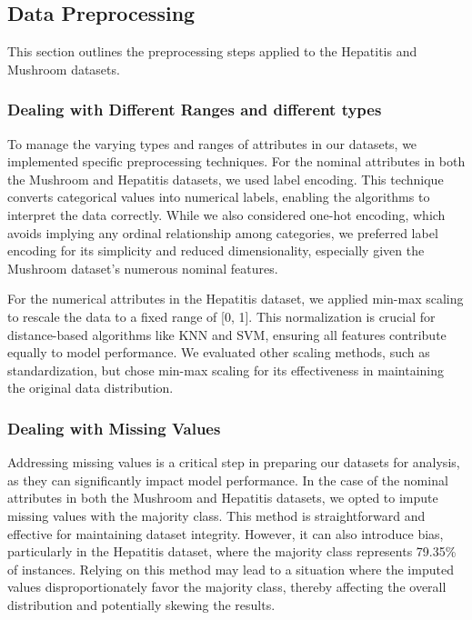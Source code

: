 \subsection{Data Preprocessing}
\label{subsec:preprocessing}

This section outlines the preprocessing steps applied to the Hepatitis and Mushroom datasets.

\subsubsection{Dealing with Different Ranges and different types}
To manage the varying types and ranges of attributes in our datasets, we implemented specific preprocessing techniques.
For the nominal attributes in both the Mushroom and Hepatitis datasets, we used label encoding.
This technique converts categorical values into numerical labels, enabling the algorithms to interpret the data correctly.
While we also considered one-hot encoding, which avoids implying any ordinal relationship among categories, we preferred label encoding for its simplicity and reduced dimensionality, especially given the Mushroom dataset's numerous nominal features.

For the numerical attributes in the Hepatitis dataset, we applied min-max scaling to rescale the data to a fixed range of [0, 1]. This normalization is crucial for distance-based algorithms like KNN and SVM, ensuring all features contribute equally to model performance.
We evaluated other scaling methods, such as standardization, but chose min-max scaling for its effectiveness in maintaining the original data distribution.

\subsubsection{Dealing with Missing Values}
Addressing missing values is a critical step in preparing our datasets for analysis, as they can significantly impact model performance.
In the case of the nominal attributes in both the Mushroom and Hepatitis datasets, we opted to impute missing values with the majority class.
This method is straightforward and effective for maintaining dataset integrity.
However, it can also introduce bias, particularly in the Hepatitis dataset, where the majority class represents 79.35\% of instances.
Relying on this method may lead to a situation where the imputed values disproportionately favor the majority class, thereby affecting the overall distribution and potentially skewing the results.

